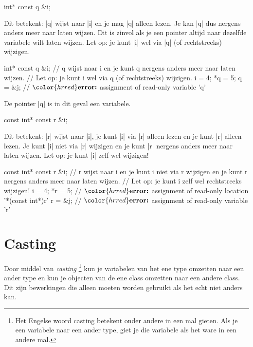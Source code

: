 \begin{cpplstShortInline}
\vspace{\baselineskip}
\begin{cpplstfragment}
int* const q {&i};
\end{cpplstfragment}
Dit betekent: |q| wijst naar |i| en je mag |q| alleen lezen. Je kan |q| dus nergens anders meer naar laten wijzen.
Dit is zinvol als je een pointer altijd naar dezelfde variabele wilt laten wijzen.
Let op: je kunt |i| wel via |q| (of rechtstreeks) wijzigen.

\begin{cpplstfragment}[mathescape=true]
    int* const q {&i};
    // q wijst naar i en je kunt q nergens anders meer naar laten wijzen. 
    // Let op: je kunt i wel via q (of rechtstreeks) wijzigen.
    i = 4;
    *q = 5;
    q = &j;
//  $\color{hrred}\textbf{error:}$ assignment of read-only variable 'q'
\end{cpplstfragment}
De pointer |q| is in dit geval een  variabele.

\begin{cpplstfragment}
const int* const r {&i};
\end{cpplstfragment}
Dit betekent: |r| wijst naar |i|, je kunt |i| via |r| alleen lezen en je kunt |r| alleen lezen. Je kunt |i| niet via |r| wijzigen en je kunt |r| nergens anders meer naar laten
wijzen. Let op: je kunt |i| zelf wel wijzigen!

\begin{cpplstfragment}[mathescape=true]
    const int* const r {&i};
    // r wijst naar i en je kunt i niet via r wijzigen en je kunt r nergens anders meer naar laten wijzen.
    // Let op: je kunt i zelf wel rechtstreeks wijzigen!
    i = 4;
    *r = 5;
//  $\color{hrred}\textbf{error:}$ assignment of read-only location '*(const int*)r'
    r = &j;
//  $\color{hrred}\textbf{error:}$ assignment of read-only variable 'r'
\end{cpplstfragment}

\section{Casting}
\label{sec:casting}
Door middel van \emph{casting}%
\footnote{%
    Het Engelse woord casting betekent onder andere in een mal gieten.
    Als je een variabele  naar een ander type, giet je die variabele als het ware in een andere mal.
} kun je variabelen van het ene type omzetten naar een ander type en kun je objecten van de ene class omzetten naar een andere class.
Dit zijn  bewerkingen die alleen moeten worden gebruikt als het echt niet anders kan.


\end{cpplstShortInline}
